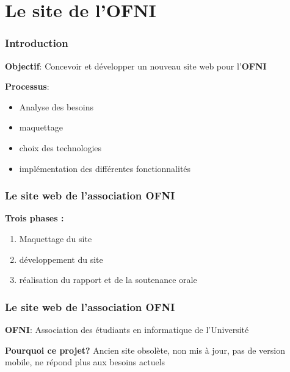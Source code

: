 \section{Le site de l'OFNI}

\begin{frame}
    \frametitle{Introduction}
    \centering
    \textbf{Objectif}: Concevoir et développer un nouveau site web pour l’\textbf{\textcolor{cardinal}{O}\textcolor{codecyan}{F}\textcolor{codeorange}{N}\textcolor{codegreen}{I}}
    \vspace{1cm}

    \pause

    \textbf{Processus}: 
    \begin{itemize}
        \item Analyse des besoins
        \item maquettage
        \item choix des technologies
        \item implémentation des différentes fonctionnalités
    \end{itemize}
\end{frame}

\begin{frame}
    \frametitle{Le site web de l’association OFNI}
    \centering

    \textbf{Trois phases :}
    \bigskip

    \begin{enumerate}
        \item Maquettage du site
        \item développement du site
        \item réalisation du rapport et de la soutenance orale
    \end{enumerate}
\end{frame}

\begin{frame}
    \frametitle{Le site web de l’association OFNI}
    \centering
    \textbf{\textcolor{cardinal}{O}\textcolor{codecyan}{F}\textcolor{codeorange}{N}\textcolor{codegreen}{I}}: Association des étudiants en informatique de l’Université
    \vspace{1cm}

    \textbf{Pourquoi ce projet?} Ancien site obsolète, non mis à jour, pas de version mobile, ne répond plus aux besoins actuels
\end{frame}
